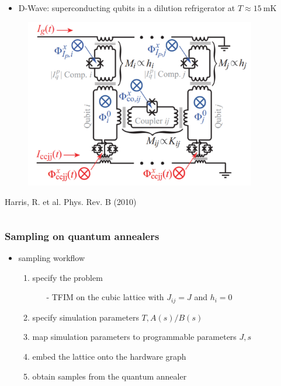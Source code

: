 \documentclass[11pt]{beamer}
\newcommand{\itemb}{\item[$\bullet$]}
\begin{document}
\begin{frame}
\begin{columns}[T]
\begin{column}{0.5\textwidth}
\begin{itemize}
                \itemb D-Wave: superconducting qubits in a dilution refrigerator at $T \approx \SI{15}{\milli\kelvin}$
            \end{itemize}
            \begin{figure}[!htb]
                \centering
                \includegraphics[width=0.9\textwidth]{../plots/sc_qubits_and_couplers.pdf}
            \end{figure}
            \vspace*{-0.5cm}
            {\tiny \hspace*{1.6em} Harris, R. et al. Phys. Rev. B (2010)}
        \end{column}
    \end{columns}
\end{frame}

\begin{frame}
    \frametitle{Sampling on quantum annealers}
    \begin{itemize}
        \setlength{\itemindent}{-1em}
        \itemb sampling workflow
        \vspace*{0.3em}
        \begin{enumerate}
            \setlength{\itemindent}{-1em}
            \item specify the problem
            \begin{itemize}
                \setlength{\itemindent}{-2em}
                \item [-] TFIM on the cubic lattice with $J_{ij} = J$ and $h_i = 0$
            \end{itemize}
            \item specify simulation parameters $T, A(s)/B(s)$
            \item map simulation parameters to programmable parameters $J, s$
            \item embed the lattice onto the hardware graph
            \item obtain samples from the quantum annealer
        \end{enumerate}
    \end{itemize}
\end{frame}
\end{document}

